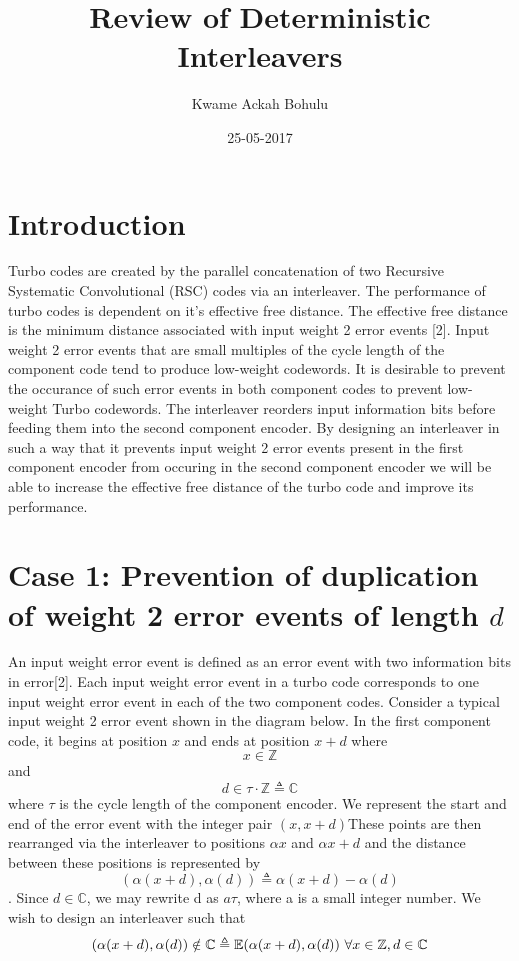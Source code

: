 \documentclass[20 pts]{article}
\title{Review of Deterministic Interleavers}
\author{Kwame Ackah Bohulu}
\date{25-05-2017}
\begin{document}
\maketitle


\section{Introduction}
Turbo codes are created by the parallel concatenation of two Recursive Systematic Convolutional (RSC) codes via an interleaver. The performance of turbo codes is dependent on it's effective free distance. The effective free distance is the minimum distance associated with input weight 2 error events [2]. Input weight 2 error events that are small multiples of the cycle length of the component code tend to produce low-weight codewords. It is desirable to prevent the occurance of such error events in both component codes to prevent low-weight Turbo codewords. The interleaver reorders input information bits  before feeding them into the second component encoder. By designing an interleaver in such a way that it prevents input weight 2 error events present in the first component encoder from occuring in the second component encoder we will be able to increase the effective free distance of the turbo code and improve its performance. 

\section{Case 1: Prevention of duplication of weight 2 error events of length $d$}
An input weight error event is defined as an error event with two information bits in error[2]. Each input weight error event in a turbo code corresponds to one input weight error event in each of the two component codes. Consider a typical input weight 2 error event shown in the diagram below. In the first component code, it begins at position $x$ and ends at position $x+d$ where $$x \in \mathbb{Z}$$ and $$d \in \tau \cdot \mathbb{Z} \triangleq \mathbb{C}$$ where $\tau$ is the cycle length of the component encoder. We represent the start and end of the error event with the integer pair $(x,x+d)$These points are then rearranged via the interleaver to positions $\alpha{x}$ and $\alpha{x+d}$ and the distance between these positions is represented by $$(\alpha(x+d),\alpha(d)) \triangleq \alpha(x+d) - \alpha(d) $$. Since $d \in \mathbb{C}$, we may rewrite d as $a\tau$, where a is a small integer number. We wish to design an interleaver such that $$(\alpha(x+d),\alpha(d)) \notin \mathbb{C} \triangleq \mathbb{E}(\alpha(x+d),\alpha(d)) \\\\\ \forall x \in \mathbb{Z} , d \in \mathbb{C}$$ 
\end{document}
